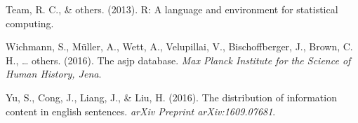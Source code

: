 \documentclass[man,floatsintext]{apa6}
\begin{document}
\leavevmode\hypertarget{ref-team2013}{}%
Team, R. C., \& others. (2013). R: A language and environment for statistical computing.

\leavevmode\hypertarget{ref-wichmann2016}{}%
Wichmann, S., Müller, A., Wett, A., Velupillai, V., Bischoffberger, J., Brown, C. H., \ldots{} others. (2016). The asjp database. \emph{Max Planck Institute for the Science of Human History, Jena}.

\leavevmode\hypertarget{ref-yu2016}{}%
Yu, S., Cong, J., Liang, J., \& Liu, H. (2016). The distribution of information content in english sentences. \emph{arXiv Preprint arXiv:1609.07681}.

\endgroup
\end{document}

